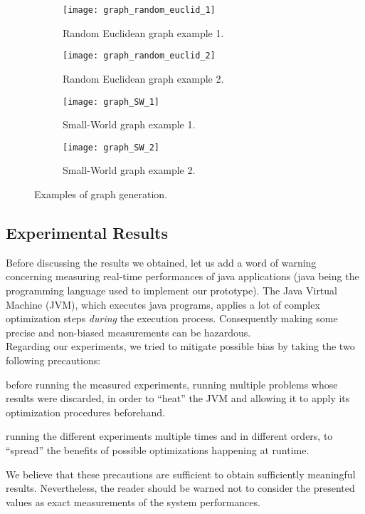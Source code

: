 \begin{figure}
\centering
	\begin{subfigure}[b]{0.45\textwidth}
		\texttt{[image: graph\_random\_euclid\_1]}
		\caption{Random Euclidean graph example 1.}\label{generatedgraphs:rand1}
	\end{subfigure}
	\begin{subfigure}[b]{0.45\textwidth}
			\texttt{[image: graph\_random\_euclid\_2]}
		\caption{Random Euclidean graph example 2.}\label{generatedgraphs:rand2}
	\end{subfigure}
	
	\begin{subfigure}[b]{0.45\textwidth}
		\texttt{[image: graph\_SW\_1]}
		\caption{Small-World graph example 1.}\label{generatedgraphs:sw1}
	\end{subfigure}
	\begin{subfigure}[b]{0.45\textwidth}
			\texttt{[image: graph\_SW\_2]}
		\caption{Small-World graph example 2.}\label{generatedgraphs:sw2}
	\end{subfigure}

\caption{Examples of graph generation.}
\label{graph_generation_examples}
\end{figure}

\subsection{Experimental Results}

Before discussing the results we obtained, let us add a word of warning concerning measuring real-time performances of java applications (java being the programming language used to implement our prototype). The Java Virtual Machine (JVM), which executes java programs, applies a lot of complex optimization steps \emph{during} the execution process. Consequently making some precise and non-biased measurements can be hazardous.\\
Regarding our experiments, we tried to mitigate possible bias by taking the two following precautions:
\begin{compactitem}
\item before running the measured experiments, running multiple problems whose results were discarded, in order to \enquote{heat} the JVM and allowing it to apply its optimization procedures beforehand.
\item running the different experiments multiple times and in different orders, to \enquote{spread} the benefits of possible optimizations happening at runtime.
\end{compactitem}
We believe that these precautions are sufficient to obtain sufficiently meaningful results. Nevertheless, the reader should be warned not to consider the presented values as exact measurements of the system performances.

